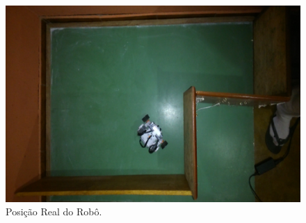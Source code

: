 \begin{figure}[H]
  \centering
  \includegraphics[scale=0.8]{figuras/cen1_ex5/real.eps}
  \caption[Posição real do Robô]{Posição Real do Robô.}
  \label{img:cen1_ex5_6}
\end{figure}

